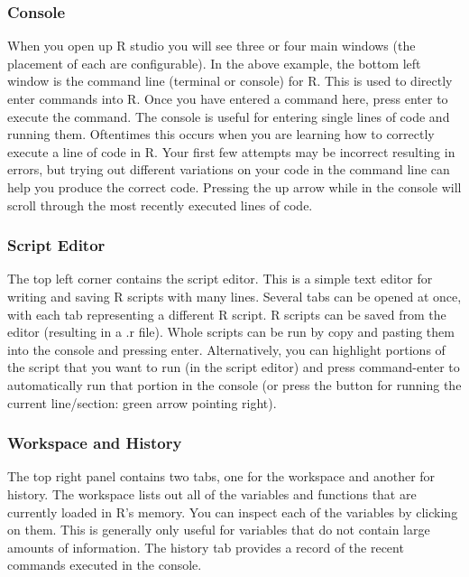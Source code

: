 \documentclass[
]{book}
\begin{document}
\hypertarget{console}{%
\subsubsection{Console}\label{console}}

When you open up R studio you will see three or four main windows (the placement of each are configurable). In the above example, the bottom left window is the command line (terminal or console) for R. This is used to directly enter commands into R. Once you have entered a command here, press enter to execute the command. The console is useful for entering single lines of code and running them. Oftentimes this occurs when you are learning how to correctly execute a line of code in R. Your first few attempts may be incorrect resulting in errors, but trying out different variations on your code in the command line can help you produce the correct code. Pressing the up arrow while in the console will scroll through the most recently executed lines of code.

\hypertarget{script-editor}{%
\subsubsection{Script Editor}\label{script-editor}}

The top left corner contains the script editor. This is a simple text editor for writing and saving R scripts with many lines. Several tabs can be opened at once, with each tab representing a different R script. R scripts can be saved from the editor (resulting in a .r file). Whole scripts can be run by copy and pasting them into the console and pressing enter. Alternatively, you can highlight portions of the script that you want to run (in the script editor) and press command-enter to automatically run that portion in the console (or press the button for running the current line/section: green arrow pointing right).

\hypertarget{workspace-and-history}{%
\subsubsection{Workspace and History}\label{workspace-and-history}}

The top right panel contains two tabs, one for the workspace and another for history. The workspace lists out all of the variables and functions that are currently loaded in R's memory. You can inspect each of the variables by clicking on them. This is generally only useful for variables that do not contain large amounts of information. The history tab provides a record of the recent commands executed in the console.
\end{document}
